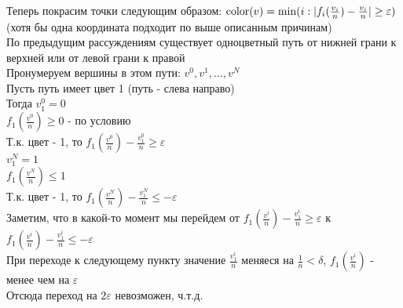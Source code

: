\documentclass[12pt]{article}
\begin{document}
\begin{enumerate}
    Теперь покрасим точки следующим образом: $\operatorname{color}(v) = \min(i: |f_i(\frac{v_i}{n}) - \frac{v_i}{n}| \geq \varepsilon)$ (хотя бы одна координата подходит по выше описанным причинам)\\
    По предыдущим рассуждениям существует одноцветный путь от нижней грани к верхней или от левой грани к правой\\
    Пронумеруем вершины в этом пути: $v^0, v^1, \ldots, v^N$\\
    Пусть путь имеет цвет 1 (путь - слева направо)\\
    Тогда $v^0_1 = 0$\\
    $f_1(\frac{v^0}{n}) \geq 0$ - по условию\\
    Т.к. цвет - 1, то $f_1(\frac{v^0}{n}) - \frac{v^0_1}{n} \geq \varepsilon$\\
    $v^N_1 = 1$\\
    $f_1(\frac{v^N}{n}) \leq 1$\\
    Т.к. цвет - 1, то $f_1(\frac{v^N}{n}) - \frac{v^N_1}{n} \leq -\varepsilon$\\
    Заметим, что в какой-то момент мы перейдем от $f_1(\frac{v^i}{n}) - \frac{v^i_1}{n} \geq \varepsilon$ к $f_1(\frac{v^i}{n}) - \frac{v^i_1}{n} \leq -\varepsilon$\\
    При переходе к следующему пункту значение $\frac{v_1^i}n$ меняеся на $\frac 1n < \delta$, $f_1(\frac{v^i}{n})$ - менее чем на $\varepsilon$\\
    Отсюда переход на $2\varepsilon$ невозможен, ч.т.д.\\
\end{enumerate}
\end{document}
